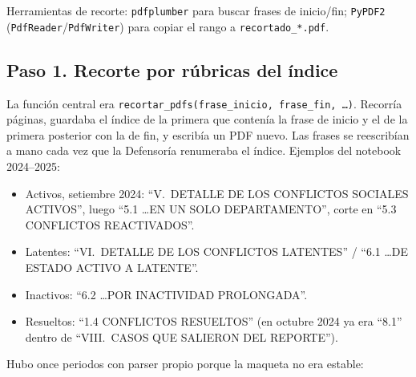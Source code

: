 \documentclass[11pt,a4paper]{article}
\begin{document}
Herramientas de recorte: \texttt{pdfplumber} para buscar frases de inicio/fin; \texttt{PyPDF2} (\texttt{PdfReader}/\texttt{PdfWriter}) para copiar el rango a \texttt{recortado\_*.pdf}.

\subsection{Paso 1. Recorte por rúbricas del índice}

La función central era \texttt{recortar\_pdfs(frase\_inicio, frase\_fin, \ldots)}. Recorría páginas, guardaba el índice de la primera que contenía la frase de inicio y el de la primera posterior con la de fin, y escribía un PDF nuevo. Las frases se reescribían a mano cada vez que la Defensoría renumeraba el índice. Ejemplos del notebook 2024--2025:

\begin{itemize}
  \item Activos, setiembre 2024: ``V.\ DETALLE DE LOS CONFLICTOS SOCIALES ACTIVOS'', luego ``5.1 \ldots EN UN SOLO DEPARTAMENTO'', corte en ``5.3 CONFLICTOS REACTIVADOS''.
  \item Latentes: ``VI.\ DETALLE DE LOS CONFLICTOS LATENTES'' / ``6.1 \ldots DE ESTADO ACTIVO A LATENTE''.
  \item Inactivos: ``6.2 \ldots POR INACTIVIDAD PROLONGADA''.
  \item Resueltos: ``1.4 CONFLICTOS RESUELTOS'' (en octubre 2024 ya era ``8.1'' dentro de ``VIII.\ CASOS QUE SALIERON DEL REPORTE'').
\end{itemize}

Hubo once periodos con parser propio porque la maqueta no era estable:
\end{document}
